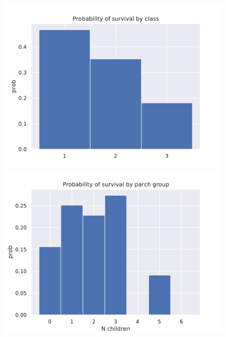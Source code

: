 \documentclass{book}
\begin{document}
\begin{figure}
    \centering
    \includegraphics[scale=.75]{../figs/prob_hist_class.pdf}
    \includegraphics[scale=.75]{../figs/prob_hist_parch.pdf}
\end{figure}



\clearpage
\end{document}
